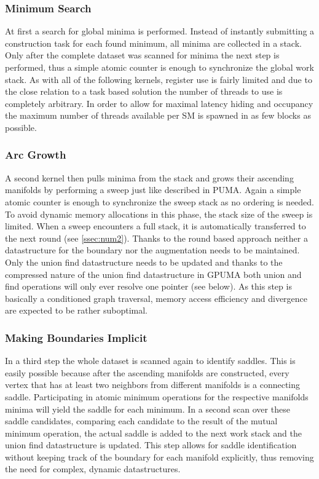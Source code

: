 \documentclass{scrartcl}
\begin{document}
\subsubsection{Minimum Search}
At first a search for global minima is performed. Instead of instantly submitting a construction task for each found minimum, all minima are collected in a stack. Only after the complete dataset was scanned for minima the next step is performed, thus a simple atomic counter is enough to synchronize the global work stack. As with all of the following kernels, register use is fairly limited and due to the close relation to a task based solution the number of threads to use is completely arbitrary. In order to allow for maximal latency hiding and occupancy the maximum number of threads available per SM is spawned in as few blocks as possible.

\subsubsection{Arc Growth}
A second kernel then pulls minima from the stack and grows their ascending manifolds by performing a sweep just like described in PUMA. Again a simple atomic counter is enough to synchronize the sweep stack as no ordering is needed. To avoid dynamic memory allocations in this phase, the stack size of the sweep is limited. When a sweep encounters a full stack, it is automatically transferred to the next round (see \ref{ssec:num2}). Thanks to the round based approach neither a datastructure for the boundary nor the augmentation needs to be maintained. Only the union find datastructure needs to be updated and thanks to the compressed nature of the union find datastructure in GPUMA both union and find operations will only ever resolve one pointer (see below). As this step is basically a conditioned graph traversal, memory access efficiency and divergence are expected to be rather suboptimal. 

\subsubsection{Making Boundaries Implicit}
In a third step the whole dataset is scanned again to identify saddles. This is easily possible because after the ascending manifolds are constructed, every vertex that has at least two neighbors from different manifolds is a connecting saddle. Participating in atomic minimum operations for the respective manifolds minima will yield the saddle for each minimum. In a second scan over these saddle candidates, comparing each candidate to the result of the mutual minimum operation, the actual saddle is added to the next work stack and the union find datastructure is updated. This step allows for saddle identification without keeping track of the boundary for each manifold explicitly, thus removing the need for complex, dynamic datastructures.
\end{document}
